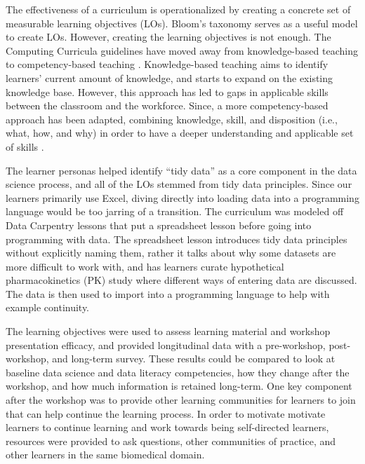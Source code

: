 \documentclass[030-workshop.tex]{subfiles}
\begin{document}
    The effectiveness of a curriculum is operationalized by creating a concrete set of
    measurable learning objectives (LOs).
    Bloom's taxonomy serves as a useful model to create LOs.
    However, creating the learning objectives is not enough.
    The Computing Curricula guidelines have moved away from knowledge-based teaching to competency-based teaching
    \cite{cc2005, cc2020, ccdsc2021}.
    Knowledge-based teaching aims to identify learners' current amount of knowledge,
    and starts to expand on the existing knowledge base.
    However, this approach has led to gaps in applicable skills between the classroom and the workforce.
    Since, a more competency-based approach has been adapted,
    combining knowledge, skill, and disposition (i.e., what, how, and why) in order
    to have a deeper understanding and applicable set of skills
    \cite{cc2005, cc2020, ccdsc2021}.

    The learner personas helped identify ``tidy data'' as a core component in the data science process,
    and all of the LOs stemmed from tidy data principles.
    Since our learners primarily use Excel,
    diving directly into loading data into a programming language would be too jarring of a transition.
    The curriculum was modeled off Data Carpentry lessons that put a spreadsheet lesson before going into programming with data.
    The spreadsheet lesson introduces tidy data principles without explicitly naming them,
    rather it talks about why some datasets are more difficult to work with,
    and has learners curate hypothetical pharmacokinetics (PK) study where different ways of entering data are discussed.
    The data is then used to import into a programming language to help with example continuity.

    The learning objectives were used to assess learning material and workshop presentation efficacy,
    and provided longitudinal data with a pre-workshop, post-workshop, and long-term survey.
    These results could be compared to look at baseline data science and data literacy competencies,
    how they change after the workshop,
    and how much information is retained long-term.
    One key component after the workshop was to provide other learning communities for learners to join
    that can help continue the learning process.
    In order to motivate motivate learners to continue learning and work towards being self-directed learners,
    resources were provided to ask questions, other communities of practice,
    and other learners in the same biomedical domain.
\end{document}
